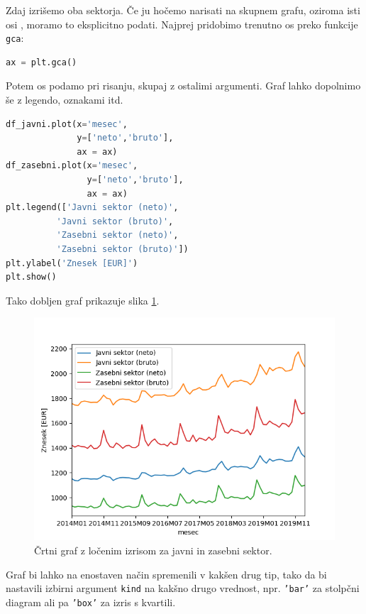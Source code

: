 Zdaj izrišemo oba sektorja. Če ju hočemo narisati na skupnem grafu, oziroma isti osi , moramo to eksplicitno podati. Najprej pridobimo trenutno os preko funkcije \texttt{gca}:
\begin{lstlisting}[language=python]
ax = plt.gca()
\end{lstlisting}
Potem os podamo pri risanju, skupaj z ostalimi argumenti. Graf lahko dopolnimo še z legendo, oznakami itd.
\begin{lstlisting}[language=python]
df_javni.plot(x='mesec',
              y=['neto','bruto'],
              ax = ax)
df_zasebni.plot(x='mesec',
                y=['neto','bruto'],
                ax = ax)
plt.legend(['Javni sektor (neto)',
          'Javni sektor (bruto)',
          'Zasebni sektor (neto)',
          'Zasebni sektor (bruto)'])
plt.ylabel('Znesek [EUR]')
plt.show()
\end{lstlisting}
Tako dobljen graf prikazuje slika \ref{img:plt_pandas2}.
\begin{figure}
    \includegraphics[width=\linewidth]{img/plt_pandas2.png}
    \caption{Črtni graf z ločenim izrisom za javni in zasebni sektor.}
    \label{img:plt_pandas2}
\end{figure}
Graf bi lahko na enostaven način spremenili v kakšen drug tip, tako da bi nastavili izbirni argument \texttt{kind} na kakšno drugo vrednost, npr. \texttt{'bar'} za stolpčni diagram ali pa \texttt{'box'} za izris s kvartili.

